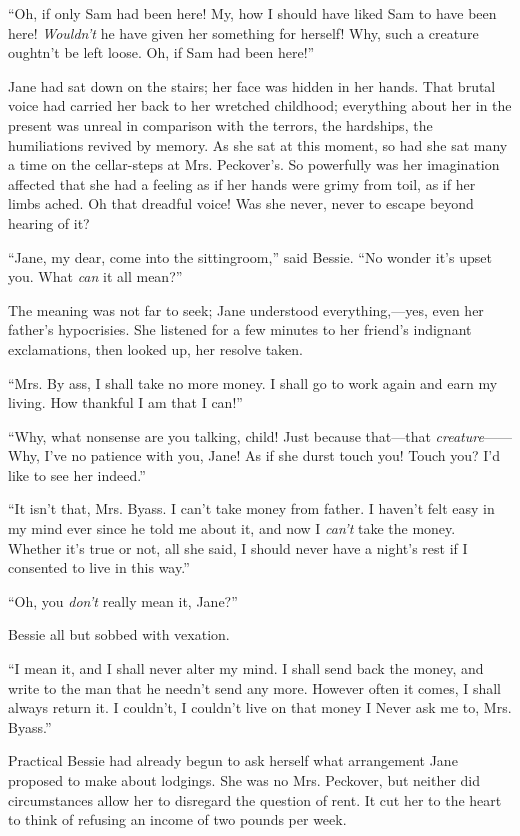 ``Oh, if only Sam had been here! My, how I should have liked Sam to have
been here! \emph{Wouldn't} he have given her something for herself! Why,
such a creature oughtn't be left loose. Oh, if Sam had been here!''

Jane had sat down on the stairs; her face was hidden in her hands. That
brutal voice had carried her back to her wretched childhood; everything
about her in the present was unreal in comparison with the terrors, the
hardships, the humiliations revived by memory. As she sat at this
moment, so had she sat many a time on the cellar-steps at Mrs.
Peckover's. So powerfully was her imagination affected that she had a
feeling as {}if her hands were grimy from toil, as if her limbs ached.
Oh that dreadful voice! Was she never, never to escape beyond hearing of
it?

``Jane, my dear, come into the sittingroom,'' said Bessie. ``No wonder
it's upset you. What \emph{can} it all mean?''

The meaning was not far to seek; Jane understood everything,---yes, even
her father's hypocrisies. She listened for a few minutes to her friend's
indignant exclamations, then looked up, her resolve taken.

``Mrs. By ass, I shall take no more money. I shall go to work again and
earn my living. How thankful I am that I can!''

``Why, what nonsense are you talking, child! Just because that---that
\emph{creature}{{------}}Why, I've no patience with you, Jane! As if she
durst touch you! Touch you? I'd like to see her indeed.''

``It isn't that, Mrs. Byass. I can't take money from father. I haven't
felt easy in my mind ever since he told me about it, and now I
\emph{can't} take the money. Whether it's true or not, all she said, I
should never have a night's rest if I consented to live in this way.''

{}``Oh, you \emph{don't} really mean it, Jane?''

Bessie all but sobbed with vexation.

``I mean it, and I shall never alter my mind. I shall send back the
money, and write to the man that he needn't send any more. However often
it comes, I shall always return it. I couldn't, I couldn't live on that
money I Never ask me to, Mrs. Byass.''

Practical Bessie had already begun to ask herself what arrangement Jane
proposed to make about lodgings. She was no Mrs. Peckover, but neither
did circumstances allow her to disregard the question of rent. It cut
her to the heart to think of refusing an income of two pounds per week.

